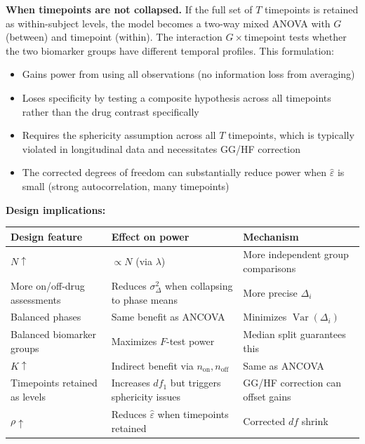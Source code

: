 \documentclass[11pt,letterpaper]{article}
\begin{document}
\textbf{When timepoints are not collapsed.} If the full set of $T$
timepoints is retained as within-subject levels, the model becomes a
two-way mixed ANOVA with $G$ (between) and timepoint (within). The
interaction $G \times \text{timepoint}$ tests whether the two biomarker
groups have different temporal profiles. This formulation:
\begin{itemize}[nosep]
\item Gains power from using all observations (no information loss from
  averaging)
\item Loses specificity by testing a composite hypothesis across all
  timepoints rather than the drug contrast specifically
\item Requires the sphericity assumption across all $T$ timepoints,
  which is typically violated in longitudinal data and necessitates
  GG/HF correction
\item The corrected degrees of freedom can substantially reduce power
  when $\hat{\varepsilon}$ is small (strong autocorrelation, many
  timepoints)
\end{itemize}

\textbf{Design implications:}

\begin{table}[h]
\centering\small
\begin{tabular}{@{}L{4cm}L{4.5cm}L{5cm}@{}}
\toprule
Design feature & Effect on power & Mechanism \\
\midrule
$N \uparrow$ & $\propto N$ (via $\lambda$) & More independent group comparisons \\
More on/off-drug assessments & Reduces $\sigma^2_\Delta$ when collapsing to phase means & More precise $\Delta_i$ \\
Balanced phases & Same benefit as ANCOVA & Minimizes $\operatorname{Var}(\Delta_i)$ \\
Balanced biomarker groups & Maximizes $F$-test power & Median split guarantees this \\
$K \uparrow$ & Indirect benefit via $n_{\text{on}}, n_{\text{off}}$ & Same as ANCOVA \\
Timepoints retained as levels & Increases $df_1$ but triggers sphericity issues & GG/HF correction can offset gains \\
$\rho \uparrow$ & Reduces $\hat{\varepsilon}$ when timepoints retained & Corrected $df$ shrink \\
\bottomrule
\end{tabular}
\end{table}
\end{document}
